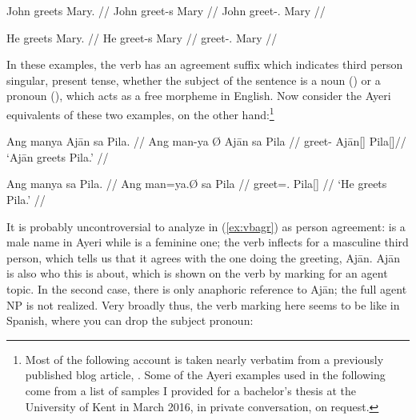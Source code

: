 \pex
\a\label{ex:vbagrengnn}\begingl{}%
	\gla John greets Mary. //
	\glb John greet-s Mary //
	\glc John greet-\Tsg{}.\Prs{} Mary //
\endgl

\a\label{ex:vbagrengpr}\begingl
	\gla He greets Mary. //
	\glb He greet-s Mary //
	\glc \TsgM{} greet-\Tsg{}.\Prs{} Mary //
\endgl

\xe

In these examples, the verb has an agreement suffix  which indicates
third person singular, present tense, whether the subject of the sentence is a
noun () or a pronoun (), which acts as a free morpheme in
English. Now consider the Ayeri equivalents of these two examples, on the other
hand:\footnote{Most of the following account is taken nearly verbatim from a
previously published blog article, \citet{benung:verbagreement}. Some of the
Ayeri examples used in the following come from a list of samples I provided for
a bachelor's thesis at the University of Kent in March 2016, in private
conversation, on request.%
}

\pex %
\a\label{ex:vbagr}\begingl
	\gla Ang manya {} Ajān sa Pila. //
	\glb Ang man-ya Ø Ajān sa Pila //
	\glc \AgtT{} greet-\TsgM{} \Top{} ​Ajān[\TsgM{}] \Parg{} Pila[\TsgF{}]//
	\glft `Ajān greets Pila.' //
\endgl

\a\label{ex:vbclt}\begingl
	\gla Ang manya sa Pila. //
	\glb Ang man=ya.Ø sa ​Pila //
	\glc \AgtT{} greet=\TsgM{}.\Top{} \Parg{} ​Pila[\TsgF{}] //
	\glft `He greets Pila.' //
\endgl

\xe

It is probably uncontroversial to analyze  in (\ref{ex:vbagr}) as
person agreement:  is a male name in Ayeri while
 is a feminine one; the verb inflects for a masculine third
person, which tells us that it agrees with the one doing the greeting, Ajān.
Ajān is also who this is about, which is shown on the verb by marking for an
agent topic. In the second case, there is only anaphoric reference to Ajān; the
full agent NP is not realized. Very broadly thus, the verb marking here seems 
to be like in Spanish, where you can drop the subject pronoun:

